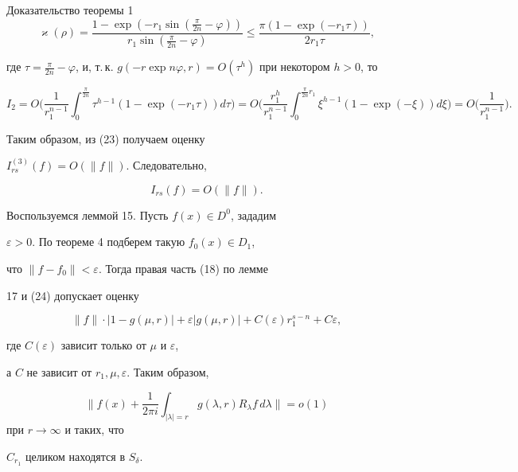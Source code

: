 \begin{pf*}{Доказательство теоремы 1}
$$


\varkappa(\rho)= \frac {1-\exp(-r_1\sin( \frac {\pi}{2n}-\varphi))}


{r_1\sin( \frac {\pi}{2n}-\varphi)}\le \frac {\pi(1-\exp(-r_1


\tau))}{2r_1\tau},


$$


где $\tau= \frac {\pi}{2n}-\varphi$, и, т.\,к. $g(-r\exp n


\varphi,r)=O(\tau^h)$ при некотором $h>0$, то


$$


I_2=O\bigg(\frac 1{r_1^{n-1}}\int_0^{ \frac{\pi}{2n}}


\tau^{h-1}(1-\exp(-r_1\tau))d\tau\bigg)=


O\bigg(\frac {r_1^h}


{r_1^{n-1}}\int_0^{ \frac {\pi}{2n}r_1}\xi^{h-1}


(1-\exp(-\xi))d\xi\bigg)=O\bigg(\frac 1{r_1^{n-1}}\bigg).


$$


Таким образом, из (23) получаем оценку


$I_{rs}^{(3)}(f)=O(\|f\|)$. Следовательно,


\begin{equation}


I_{rs}(f)=O(\|f\|).


\end{equation}


Воспользуемся леммой 15. Пусть $f(x)\in D^0$, зададим


$\varepsilon>0$. По теореме 4 подберем такую $f_0(x)\in D_1$,


что $\|f-f_0\|<\varepsilon$. Тогда правая часть (18) по лемме


17 и (24) допускает оценку


$$


\|f\|\cdot|1-g(\mu,r)|+\varepsilon|g(\mu,r)|+C(\varepsilon)r_1^{s-n}+


C\varepsilon,


$$


где $C(\varepsilon)$ зависит только от $\mu$ и $\varepsilon$,


а $C$ не зависит от $r_1,\mu,\varepsilon$. Таким образом,


$$


\bigg\|f(x)+ \frac 1{2\pi i}\int_{|\lambda|=r}g(\lambda,r)


R_\lambda f\,d\lambda\bigg\|=o(1)


$$ при $r\to\infty$ и таких, что


$C_{r_1}$ целиком находятся в $S_\delta$.


\end{pf*}








